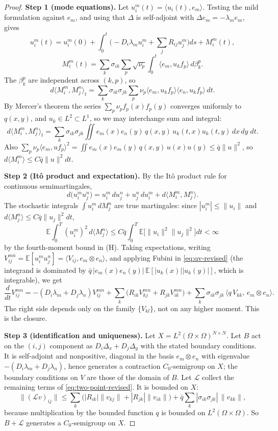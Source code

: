 \begin{proof}
\textbf{Step 1 (mode equations).} Let $u_i^m(t)=\langle u_i(t),e_m\rangle$. Testing the mild formulation against $e_m$, and using that $\Delta$ is self-adjoint with $\Delta e_m=-\lambda_m e_m$, gives
\[
u_i^m(t)=u_i^m(0)+\int_0^t\Big(-D_i\lambda_m u_i^m+\sum_j R_{ij}u_j^m\Big)ds+M_i^m(t),
\]
\[
M_i^m(t)=\sum_k\sigma_{ik}\sum_p\sqrt{\nu_p}\int_0^t\langle e_m,u_k f_p\rangle\,d\beta_k^p .
\]
The $\beta_k^p$ are independent across $(k,p)$, so
\[
d\langle M_i^m,M_j^n\rangle_t=\sum_k\sigma_{ik}\sigma_{jk}\sum_p\nu_p\langle e_m,u_kf_p\rangle\langle e_n,u_kf_p\rangle\,dt .
\]
By Mercer's theorem the series $\sum_p\nu_p f_p(x)f_p(y)$ converges uniformly to $q(x,y)$, and $u_k\in L^2\subset L^1$, so we may interchange sum and integral:
\begin{equation}\label{eq:qv-revised}
d\langle M_i^m,M_j^n\rangle_t=\sum_k\sigma_{ik}\sigma_{jk}\iint e_m(x)e_n(y)\,q(x,y)\,u_k(t,x)u_k(t,y)\,dx\,dy\;dt .
\end{equation}
Also $\sum_p\nu_p\langle e_m,u f_p\rangle^2=\iint e_m(x)e_m(y)\,q(x,y)\,u(x)u(y)\le\bar q\|u\|^2$, so $d\langle M_i^m\rangle\le C\bar q\|u\|^2dt$.
 
\textbf{Step 2 (Itô product and expectation).} By the Itô product rule for continuous semimartingales,
\[
d\big(u_i^mu_j^n\big)=u_i^m\,du_j^n+u_j^n\,du_i^m+d\langle M_i^m,M_j^n\rangle .
\]
The stochastic integrals $\int u_i^m\,dM_j^n$ are true martingales: since $|u_i^m|\le\|u_i\|$ and $d\langle M_j^n\rangle\le C\bar q\|u_j\|^2dt$,
\[
\mathbb{E}\int_0^T(u_i^m)^2\,d\langle M_j^n\rangle\le C\bar q\int_0^T\mathbb{E}\big[\|u_i\|^2\|u_j\|^2\big]dt<\infty
\]
by the fourth-moment bound in (H). Taking expectations, writing $V_{ij}^{mn}=\mathbb{E}[u_i^mu_j^n]=\langle V_{ij},e_m\otimes e_n\rangle$, and applying Fubini in \eqref{eq:qv-revised} (the integrand is dominated by $\bar q\,|e_m(x)e_n(y)|\,\mathbb{E}[|u_k(x)||u_k(y)|]$, which is integrable), we get
\begin{equation}\label{eq:coef-ode-revised}
\frac{d}{dt}V_{ij}^{mn}=-(D_i\lambda_m+D_j\lambda_n)V_{ij}^{mn}+\sum_k\big(R_{ik}V_{kj}^{mn}+R_{jk}V_{ik}^{mn}\big)+\sum_k\sigma_{ik}\sigma_{jk}\,\big\langle q\,V_{kk},\,e_m\otimes e_n\big\rangle .
\end{equation}
The right side depends only on the family $\{V_{kl}\}$, not on any higher moment. This is the closure.
 
\textbf{Step 3 (identification and uniqueness).} Let $X=L^2(\Omega\times\Omega)^{N\times N}$. Let $B$ act on the $(i,j)$ component as $D_i\Delta_x+D_j\Delta_y$ with the stated boundary conditions. It is self-adjoint and nonpositive, diagonal in the basis $e_m\otimes e_n$ with eigenvalue $-(D_i\lambda_m+D_j\lambda_n)$, hence generates a contraction $C_0$-semigroup on $X$; the boundary conditions on $V$ are those of the domain of $B$. Let $\mathcal L$ collect the remaining terms of \eqref{eq:two-point-revised}. It is bounded on $X$:
\[
\|(\mathcal L v)_{ij}\|\le\sum_k\big(|R_{ik}|\|v_{kj}\|+|R_{jk}|\|v_{ik}\|\big)+\bar q\sum_k|\sigma_{ik}\sigma_{jk}|\,\|v_{kk}\| ,
\]
because multiplication by the bounded function $q$ is bounded on $L^2(\Omega\times\Omega)$. So $B+\mathcal L$ generates a $C_0$-semigroup on $X$.
 

\end{proof}
